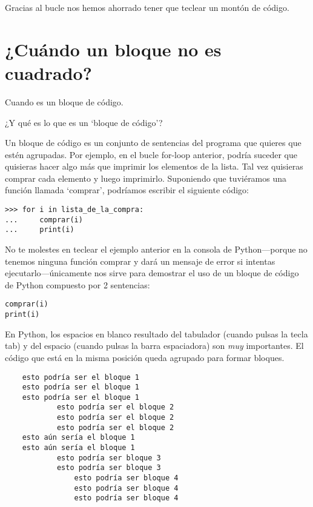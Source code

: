 Gracias al bucle nos hemos ahorrado tener que teclear un montón de código.

\section{¿Cuándo un bloque no es cuadrado?}

Cuando es un bloque de código.
\par
\noindent
¿Y qué es lo que es un `bloque de código'?
\par
Un bloque de código es un conjunto de sentencias del programa que quieres que estén agrupadas.  Por ejemplo, en el bucle for-loop anterior, podría suceder que quisieras hacer algo más que imprimir los elementos de la lista.  Tal vez quisieras comprar cada elemento y luego imprimirlo.  Suponiendo que tuviéramos una función llamada `comprar', podríamos escribir el siguiente código:

\begin{listingignore}
\begin{verbatim}
>>> for i in lista_de_la_compra:
...     comprar(i)
...     print(i)
\end{verbatim}
\end{listingignore}

No te molestes en teclear el ejemplo anterior en la consola de Python---porque no tenemos ninguna función comprar y dará un mensaje de error si intentas ejecutarlo---únicamente nos sirve para demostrar el uso de un bloque de código de Python compuesto por 2 sentencias:

\begin{listingignore}
\begin{verbatim}
comprar(i)
print(i)
\end{verbatim}
\end{listingignore}

En Python, los espacios en blanco resultado del tabulador (cuando pulsas la tecla tab) y del espacio (cuando pulsas la barra espaciadora) son \emph{muy} importantes.  El código que está en la misma posición queda agrupado para formar bloques.

\begin{listing}
\begin{verbatim}
    esto podría ser el bloque 1
    esto podría ser el bloque 1
    esto podría ser el bloque 1
	        esto podría ser el bloque 2
	        esto podría ser el bloque 2
	        esto podría ser el bloque 2
    esto aún sería el bloque 1
    esto aún sería el bloque 1
	        esto podría ser bloque 3
	        esto podría ser bloque 3
	            esto podría ser bloque 4
	            esto podría ser bloque 4
	            esto podría ser bloque 4
\end{verbatim}
\end{listing}

